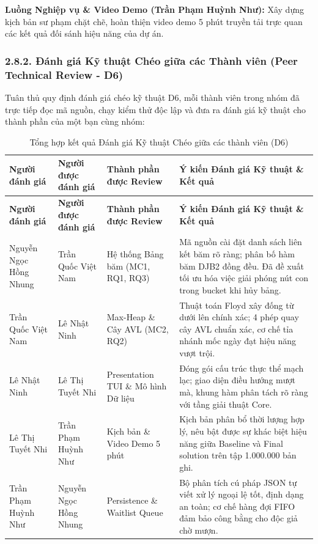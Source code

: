 \documentclass[14pt,a4paper]{extarticle}
\begin{document}
\textbf{Luồng Nghiệp vụ \& Video Demo (Trần Phạm Huỳnh Như):} Xây dựng kịch bản sư phạm chặt chẽ, hoàn thiện video demo 5 phút truyền tải trực quan các kết quả đối sánh hiệu năng của dự án.

\subsubsection*{2.8.2. Đánh giá Kỹ thuật Chéo giữa các Thành viên (Peer Technical Review - D6)}

Tuân thủ quy định đánh giá chéo kỹ thuật D6, mỗi thành viên trong nhóm đã trực tiếp đọc mã nguồn, chạy kiểm thử độc lập và đưa ra đánh giá kỹ thuật cho thành phần của một bạn cùng nhóm:

\begingroup
{}
\setlength{\tabcolsep}{4pt}
\renewcommand{\arraystretch}{1.1}
\begin{xltabular}{\linewidth}{|>{\raggedright\arraybackslash}m{2.3cm}|>{\raggedright\arraybackslash}m{2.4cm}|>{\raggedright\arraybackslash}m{2.8cm}|>{\raggedright\arraybackslash}X|}
\caption{Tổng hợp kết quả Đánh giá Kỹ thuật Chéo giữa các thành viên (D6)}\label{tab:peer_review_d6} \\
\hline
\textbf{Người đánh giá} & \textbf{Người được đánh giá} & \textbf{Thành phần được Review} & \textbf{Ý kiến Đánh giá Kỹ thuật \& Kết quả} \\ \hline
\endfirsthead

\hline
\textbf{Người đánh giá} & \textbf{Người được đánh giá} & \textbf{Thành phần được Review} & \textbf{Ý kiến Đánh giá Kỹ thuật \& Kết quả} \\ \hline
\endhead

\hline
\endfoot

Nguyễn Ngọc Hồng Nhung & Trần Quốc Việt Nam & Hệ thống Bảng băm (MC1, RQ1, RQ3) & Mã nguồn cài đặt danh sách liên kết băm rõ ràng; phân bố hàm băm DJB2 đồng đều. Đã đề xuất tối ưu hóa việc giải phóng nút con trong bucket khi hủy bảng. \\ \hline
Trần Quốc Việt Nam & Lê Nhật Ninh & Max-Heap \& Cây AVL (MC2, RQ2) & Thuật toán Floyd xây đống từ dưới lên chính xác; 4 phép quay cây AVL chuẩn xác, cơ chế tỉa nhánh mốc ngày đạt hiệu năng vượt trội. \\ \hline
Lê Nhật Ninh & Lê Thị Tuyết Nhi & Presentation TUI \& Mô hình Dữ liệu & Đóng gói cấu trúc thực thể mạch lạc; giao diện điều hướng mượt mà, khung hàm phân tách rõ ràng với tầng giải thuật Core. \\ \hline
Lê Thị Tuyết Nhi & Trần Phạm Huỳnh Như & Kịch bản \& Video Demo 5 phút & Kịch bản phân bổ thời lượng hợp lý, nêu bật được sự khác biệt hiệu năng giữa Baseline và Final solution trên tập 1.000.000 bản ghi. \\ \hline
Trần Phạm Huỳnh Như & Nguyễn Ngọc Hồng Nhung & Persistence \& Waitlist Queue & Bộ phân tích cú pháp JSON tự viết xử lý ngoại lệ tốt, định dạng an toàn; cơ chế hàng đợi FIFO đảm bảo công bằng cho độc giả chờ mượn. \\ \hline
\end{xltabular}
\endgroup
\end{document}
